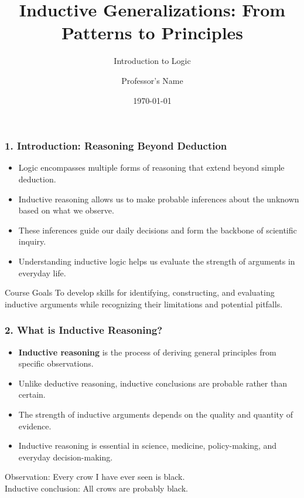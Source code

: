 \documentclass{beamer}
\title{Inductive Generalizations: From Patterns to Principles}
\subtitle{Introduction to Logic}
\author{Professor's Name}
\institute{University Name}
\date{\today}
\begin{document}
\begin{frame}
\titlepage
\end{frame}

\begin{frame}
\frametitle{1. Introduction: Reasoning Beyond Deduction}
\begin{itemize}
\item Logic encompasses multiple forms of reasoning that extend beyond simple deduction.
\item Inductive reasoning allows us to make probable inferences about the unknown based on what we observe.
\item These inferences guide our daily decisions and form the backbone of scientific inquiry.
\item Understanding inductive logic helps us evaluate the strength of arguments in everyday life.
\end{itemize}

\begin{block}{Course Goals}
To develop skills for identifying, constructing, and evaluating inductive arguments while recognizing their limitations and potential pitfalls.
\end{block}
\end{frame}

\begin{frame}
\frametitle{2. What is Inductive Reasoning?}
\begin{itemize}
\item \textbf{Inductive reasoning} is the process of deriving general principles from specific observations.
\item Unlike deductive reasoning, inductive conclusions are probable rather than certain.
\item The strength of inductive arguments depends on the quality and quantity of evidence.
\item Inductive reasoning is essential in science, medicine, policy-making, and everyday decision-making.
\end{itemize}

\begin{example}
Observation: Every crow I have ever seen is black.\\
Inductive conclusion: All crows are probably black.
\end{example}
\end{frame}
\end{document}
